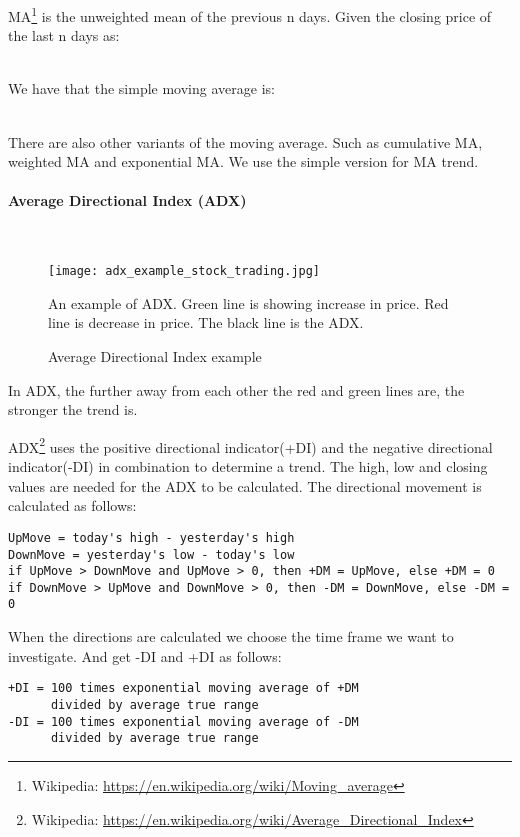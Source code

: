 MA\footnote{Wikipedia: \url{https://en.wikipedia.org/wiki/Moving_average}} is
the unweighted mean of the previous n days. Given the closing price of the last
n days as: 

\\

We have that the simple moving average is: 

\\

There are also other variants of the moving average. Such as cumulative MA,
weighted MA and exponential MA. We use the simple version for MA trend. 

\paragraph{Average Directional Index (ADX)}
\hspace{0pt}\\

\begin{figure}[htb]
    \centering
    \texttt{[image: adx\_example\_stock\_trading.jpg]}
    \label{fig:adx_example_stock_trading}
    \caption{Average Directional Index example}
An example of ADX. Green line is showing increase in price. Red line is
decrease in price. The black line is the ADX.
\end{figure}
In ADX, the further away from each other the red and green lines are, the
stronger the trend is. 

ADX\footnote{Wikipedia:
\url{https://en.wikipedia.org/wiki/Average_Directional_Index}} uses the positive directional indicator(+DI) and the negative directional
indicator(-DI) in combination to determine a trend. The high, low and closing
values are needed for the ADX to be calculated. The directional movement is
calculated as follows: 
\begin{verbatim}
UpMove = today's high - yesterday's high
DownMove = yesterday's low - today's low
if UpMove > DownMove and UpMove > 0, then +DM = UpMove, else +DM = 0
if DownMove > UpMove and DownMove > 0, then -DM = DownMove, else -DM = 0 
\end{verbatim} 

When the directions are calculated we choose the time frame we want to
investigate. And get -DI and +DI as follows:
\begin{verbatim}
+DI = 100 times exponential moving average of +DM 
      divided by average true range
-DI = 100 times exponential moving average of -DM 
      divided by average true range 
\end{verbatim} 

